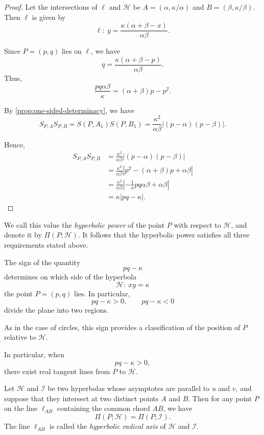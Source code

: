 \documentclass[12pt]{article}
\begin{document}
\begin{proof}
Let the intersections of $\ell$ and $\mathcal H$ be
$A=(\alpha,\kappa/\alpha)$ and $B=(\beta,\kappa/\beta)$.
Then $\ell$ is given by
\[
\ell:\ y=\frac{\kappa(\alpha+\beta-x)}{\alpha\beta}.
\]

Since $P=(p,q)$ lies on $\ell$, we have
\[
q=\frac{\kappa(\alpha+\beta-p)}{\alpha\beta}.
\]
Thus,
\[
\frac{pq\alpha\beta}{\kappa}
=
(\alpha+\beta)p-p^2.
\]

By \cref{prop:one-sided-determinacy}, we have
\[
S_{P,A}S_{P,B}
=
S(P,A_1)S(P,B_1)
=
\frac{\kappa^2}{\alpha\beta}|(p-\alpha)(p-\beta)|.
\]

Hence,
\begin{align*}
S_{P,A}S_{P,B}
&=
\frac{\kappa^2}{\alpha\beta}|(p-\alpha)(p-\beta)|\\
&=
\frac{\kappa^2}{\alpha\beta}|p^2-(\alpha+\beta)p+\alpha\beta|\\
&=
\frac{\kappa^2}{\alpha\beta}\left|-\frac{1}{\kappa}pq\alpha\beta+\alpha\beta\right|\\
&=
\kappa|pq-\kappa|.
\end{align*}
\end{proof}

We call this value the \emph{hyperbolic power} of the point $P$
with respect to $\mathcal H$, and denote it by $\Pi(P;\mathcal H)$.
It follows that the hyperbolic power satisfies all three requirements
stated above.

\begin{remark}
The sign of the quantity
\[
pq-\kappa
\]
determines on which side of the hyperbola
\[
\mathcal H:\ xy=\kappa
\]
the point $P=(p,q)$ lies.
In particular,
\[
pq-\kappa>0,\qquad pq-\kappa<0
\]
divide the plane into two regions.

As in the case of circles, this sign provides a classification
of the position of $P$ relative to $\mathcal H$.

In particular, when
\[
pq-\kappa>0,
\]
there exist real tangent lines from $P$ to $\mathcal H$.
\end{remark}


\begin{theorem}
\label{thm:hyperbolic-radical-axis}
Let $\mathcal{H}$ and $\mathcal{I}$ be two hyperbolas whose asymptotes are parallel to $u$ and $v$,
and suppose that they intersect at two distinct points $A$ and $B$.
Then for any point $P$ on the line $\ell_{AB}$ containing the common chord $AB$, we have
\[
\Pi(P;\mathcal{H})=\Pi(P;\mathcal{I}).
\]
The line $\ell_{AB}$ is called the \emph{hyperbolic radical axis} of $\mathcal{H}$ and $\mathcal{I}$.
\end{theorem}
\end{document}
